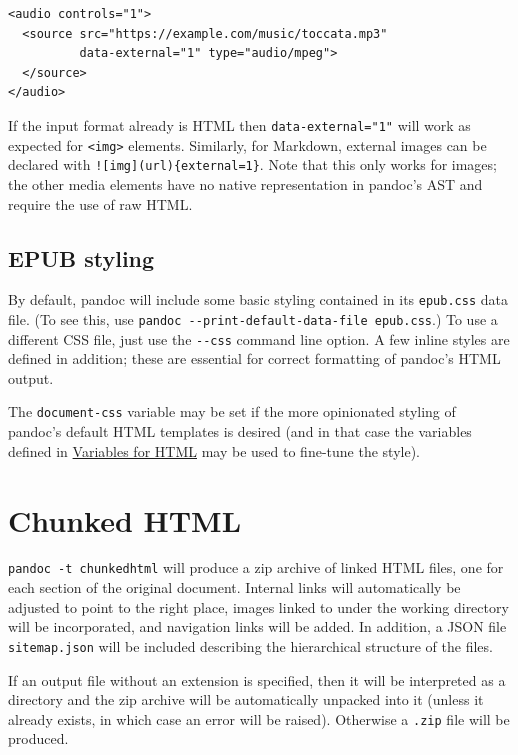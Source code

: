 \documentclass[
  b5paper
]{book}
\begin{document}
\begin{verbatim}
<audio controls="1">
  <source src="https://example.com/music/toccata.mp3"
          data-external="1" type="audio/mpeg">
  </source>
</audio>
\end{verbatim}

If the input format already is HTML then \texttt{data-external="1"} will
work as expected for \texttt{\textless{}img\textgreater{}} elements.
Similarly, for Markdown, external images can be declared with
\texttt{!{[}img{]}(url)\{external=1\}}. Note that this only works for
images; the other media elements have no native representation in
pandoc's AST and require the use of raw HTML.

\section{EPUB styling}\label{epub-styling}

By default, pandoc will include some basic styling contained in its
\texttt{epub.css} data file. (To see this, use
\texttt{pandoc\ -\/-print-default-data-file\ epub.css}.) To use a
different CSS file, just use the \texttt{-\/-css} command line option. A
few inline styles are defined in addition; these are essential for
correct formatting of pandoc's HTML output.

The \texttt{document-css} variable may be set if the more opinionated
styling of pandoc's default HTML templates is desired (and in that case
the variables defined in \hyperref[variables-for-html]{Variables for
HTML} may be used to fine-tune the style).

\chapter{Chunked HTML}\label{chunked-html}

\texttt{pandoc\ -t\ chunkedhtml} will produce a zip archive of linked
HTML files, one for each section of the original document. Internal
links will automatically be adjusted to point to the right place, images
linked to under the working directory will be incorporated, and
navigation links will be added. In addition, a JSON file
\texttt{sitemap.json} will be included describing the hierarchical
structure of the files.

If an output file without an extension is specified, then it will be
interpreted as a directory and the zip archive will be automatically
unpacked into it (unless it already exists, in which case an error will
be raised). Otherwise a \texttt{.zip} file will be produced.
\end{document}

